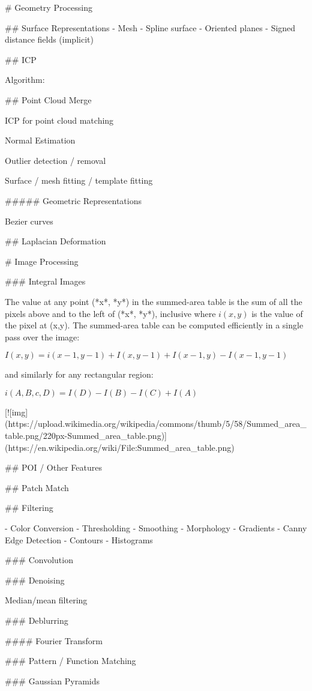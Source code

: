 # Geometry Processing 

## Surface Representations 
- Mesh
- Spline surface
- Oriented planes
- Signed distance fields (implicit)

## ICP

Algorithm:

## Point Cloud Merge

ICP for point cloud matching

Normal Estimation

Outlier detection / removal 

Surface / mesh fitting / template fitting

##### Geometric Representations

Bezier curves

## Laplacian Deformation



# Image Processing

### Integral Images

The value at any point (*x*, *y*) in the summed-area table is the sum of all the pixels above and to the left of (*x*, *y*), inclusive where $i(x,y)$  is the value of the pixel at (x,y). The summed-area table can be computed efficiently in a single pass over the image:

$I(x,y) = i(x-1,y-1) + I(x,y-1) + I(x-1,y)-I(x-1,y-1)$

and similarly for any rectangular region:

$ i(A,B,c,D) = I(D) - I(B) - I(C)+I(A)$

[![img](https://upload.wikimedia.org/wikipedia/commons/thumb/5/58/Summed_area_table.png/220px-Summed_area_table.png)](https://en.wikipedia.org/wiki/File:Summed_area_table.png)





## POI / Other Features

## Patch Match

## Filtering

- Color Conversion
- Thresholding
- Smoothing
- Morphology
- Gradients
- Canny Edge Detection
- Contours
- Histograms

### Convolution

### Denoising

Median/mean filtering

### Deblurring

#### Fourier Transform

### Pattern / Function Matching

### Gaussian Pyramids



